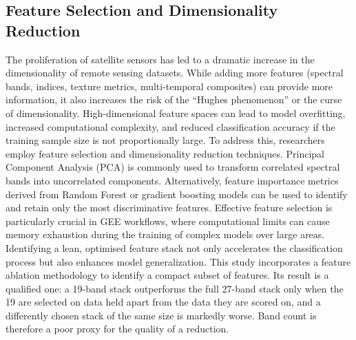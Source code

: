 \documentclass[conference]{IEEEtran}
\begin{document}
\subsection{Feature Selection and Dimensionality Reduction}
The proliferation of satellite sensors has led to a dramatic increase in the dimensionality of remote sensing datasets. While adding more features (spectral bands, indices, texture metrics, multi-temporal composites) can provide more information, it also increases the risk of the ``Hughes phenomenon'' \cite{r32} or the curse of dimensionality. High-dimensional feature spaces can lead to model overfitting, increased computational complexity, and reduced classification accuracy if the training sample size is not proportionally large.
To address this, researchers employ feature selection and dimensionality reduction techniques. Principal Component Analysis (PCA) is commonly used to transform correlated spectral bands into uncorrelated components. Alternatively, feature importance metrics derived from Random Forest or gradient boosting models can be used to identify and retain only the most discriminative features.
Effective feature selection is particularly crucial in GEE workflows, where computational limits can cause memory exhaustion during the training of complex models over large areas. Identifying a lean, optimised feature stack not only accelerates the classification process but also enhances model generalization. This study incorporates a feature ablation methodology to identify a compact subset of features. Its result is a qualified one: a 19-band stack outperforms the full 27-band stack only when the 19 are selected on data held apart from the data they are scored on, and a differently chosen stack of the same size is markedly worse. Band count is therefore a poor proxy for the quality of a reduction.
\end{document}
